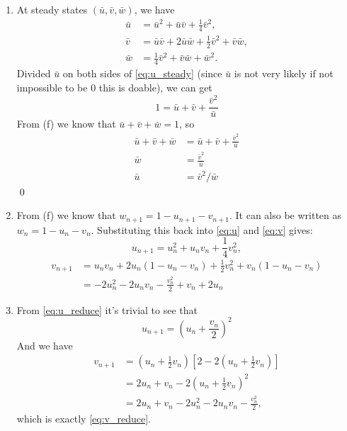 \begin{homeworkProblem}[18]
\begin{enumerate}
\item At steady states $\left(\bar u, \bar v, \bar w\right)$, we have
\begin{align}
    \bar u &= \bar u^2 + \bar u \bar v + \frac{1}{4} \bar v^2, \label{eq:u_steady}\\
    \bar v &= \bar u \bar v + 2\bar u \bar w + \frac{1}{2}\bar v^2 + \bar v \bar w,\\
    \bar w &= \frac{1}{4} \bar v^2 + \bar v \bar w + \bar w^2.
\end{align}
Divided $\bar u$ on both sides of \eqref{eq:u_steady} (since $\bar u$ is not
very likely if not impossible to be $0$ this is doable), we can get \[
    1 = \bar u + \bar v + \frac{\bar v^2}{\bar u}
\]
From (f) we know that $\bar u + \bar v + \bar w = 1$, so \[
    \begin{aligned}
        \bar u + \bar v + \bar w &= \bar u + \bar v + \frac{\bar v^2}{\bar u}\\
        \bar w &= \frac{\bar v^2}{\bar u}\\
        \bar u &= \bar{v}^2 / \bar{w}
    \end{aligned}
\] \qed
\item From (f) we know that $w_{n+1} = 1 - u_{n+1} - v_{n+1}$. It can also be
written as $w_n = 1 - u_n - v_n$. Substituting this back into \eqref{eq:u} and
\eqref{eq:v} gives:\begin{equation}
    u_{n+1} = u_n^2 + u_nv_n + \frac{1}{4}v_n^2, \label{eq:u_reduce}
\end{equation}
\begin{equation}
    \begin{split}
    v_{n+1} &= u_nv_n + 2u_n(1 - u_n - v_n) + \frac{1}{2}v_n^2 +
    v_n(1 - u_n - v_n)\\
    &= -2u_n^2 -2u_nv_n-\frac{v_n^2}{2}+v_n+2u_n\label{eq:v_reduce}
    \end{split}
\end{equation}

\item From \eqref{eq:u_reduce} it's trivial to see that
\[
    u_{n+1} = \left(u_n + \frac{v_n}{2}\right)^2
\]
And we have \[
    \begin{aligned}
        v_{n+1} &= (u_n + \frac{1}{2}v_{n})[2 - 2 (u_n + \frac{1}{2}v_n)]\\
        &= 2u_n + v_n - 2(u_n + \frac{1}{2}v_n)^2\\
        &= 2u_n + v_n - 2u_n^2 - 2u_nv_n - \frac{v_n^2}{2},
    \end{aligned}
\]which is exactly \eqref{eq:v_reduce}.


\end{enumerate}
\end{homeworkProblem}
